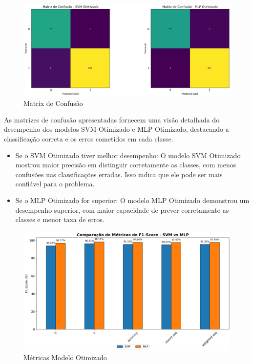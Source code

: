\documentclass[12pt,a4paper,oneside,openany]{article}
\begin{document}
\noindent
\begin{figure}[H]
    \centering
    \includegraphics[width=0.8\linewidth]{graficos/matrix_confudao_otimização.png}
    \caption{Matrix de Confusão}
    \label{fig:Matriz de Confusão}
\end{figure}

\noindent
As matrizes de confusão apresentadas fornecem uma visão detalhada do desempenho dos modelos SVM Otimizado e MLP Otimizado, destacando a classificação correta e os erros cometidos em cada classe.

\noindent
\begin{itemize}
    \item Se o SVM Otimizado tiver melhor desempenho: O modelo SVM Otimizado mostrou maior precisão em distinguir corretamente as classes, com menos confusões nas classificações erradas. Isso indica que ele pode ser mais confiável para o problema.
    \item Se o MLP Otimizado for superior: O modelo MLP Otimizado demonstrou um desempenho superior, com maior capacidade de prever corretamente as classes e menor taxa de erros.
\end{itemize}

\noindent
\begin{figure}[H]
    \centering
    \includegraphics[width=0.8\linewidth]{graficos/metricas_otimizado.png}
    \caption{Métricas Modelo Otimizado}
    \label{fig:Métricas Modelo Otimizado}
\end{figure}
\end{document}
